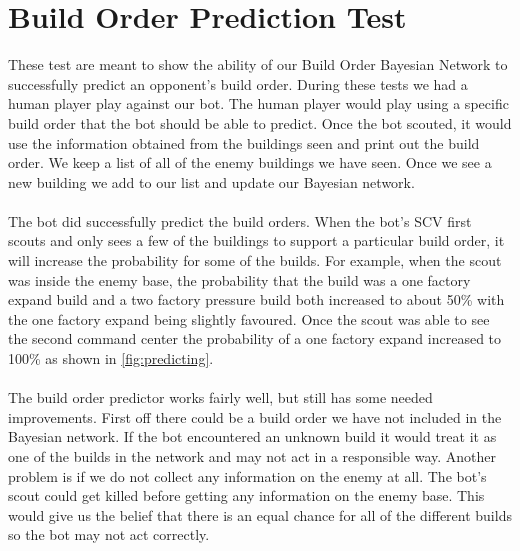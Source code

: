 \section{Build Order Prediction Test}
These test are meant to show the ability of our Build Order Bayesian Network to successfully predict an opponent's build order.
During these tests we had a human player play against our bot. The human player would play using a specific build order that the bot should be able to predict. Once the bot scouted, it would use the information obtained from the buildings seen and print out the build order. We keep a list of all of the enemy buildings we have seen. Once we see a new building we add to our list and update our Bayesian network.\\
\\
The bot did successfully predict the build orders. When the bot's SCV first scouts and only sees a few of the buildings to support a particular build order, it will increase the probability for some of the builds. For example, when the scout was inside the enemy base, the probability that the build was a one factory expand build and a two factory pressure build both increased to about 50\% with the one factory expand being slightly favoured. Once the scout was able to see the second command center the probability of a one factory expand increased to 100\% as shown in \ref{fig:predicting}. 
\\
\\
The build order predictor works fairly well, but still has some needed improvements. First off there could be a build order we have not included in the Bayesian network. If the bot encountered an unknown build it would treat it as one of the builds in the network and may not act in a responsible way. Another problem is if we do not collect any information on the enemy at all. The bot's scout could get killed before getting any information on the enemy base. This would give us the belief that there is an equal chance for all of the different builds so the bot may not act correctly.

